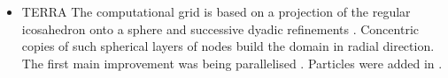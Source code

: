 \begin{itemize}
\begin{scriptsize}
\twothousandeleven: \cite{qube11}\cite{ellw11}\\
\twothousandtwelve: \cite{buit12}\cite{tebu12}\cite{crsg12}\cite{grel12}\\
\twothousandthirteen: \cite{ghbu13}\\
\twothousandfourteen: \cite{ghbu14}\cite{qubu14}\\
\twothousandfifteen: \cite{nabu15}\\
\twothousandsixteen: \cite{zwsn16}\\
\twothousandseventeen: \cite{nabp17}\\
\twothousandeighteen: \cite{tebu18}\\
\twothousandnineteen: \cite{elgb19}\\
\twothousandtwenty: \cite{pena20}
\end{scriptsize}


\item {\codefont TERRA} 
The computational grid is based on a projection of the regular icosahedron onto a 
sphere and successive dyadic refinements \cite{bafr85}.  Concentric copies of such  
spherical layers of nodes build the domain in radial direction.
The first main improvement was being parallelised \cite{buba95}.
Particles were added in \cite{strb02}.


\end{itemize}

